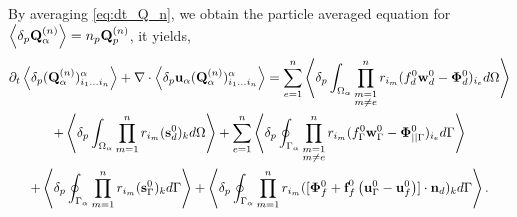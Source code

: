 By averaging \ref{eq:dt_Q_n}, we obtain the particle averaged equation for $\left<\delta_{p} \textbf{Q}_\alpha^{(n)}\right> = n_p\textbf{Q}_p^{(n)} $, it yields,
\begin{multline}
    \pddt \pavg{(\textbf{Q}_\alpha^{(n)})_{i_1\ldots i_n}^\alpha}
    + \div  \pavg{\textbf{u}_\alpha (\textbf{Q}_\alpha^{(n)})_{i_1\ldots i_n}^\alpha}
    = \sum_{e=1}^{n} 
    \pOavg{
        \prod^{n}_{\substack{ m=1 \\m \neq e}} r_{i_m} (f_d^0\textbf{w}_d^0  - \bm\Phi_d^0)_{i_e}
    }\\
    + \pOavg{ \pri{1}{n} (\textbf{s}_d^0)_k }
    +     
    \sum_{e=1}^{n} 
    \pSavg{
        \prod^{n}_{\substack{ m=1 \\m \neq e}} r_{i_m} (f_\Gamma^0\textbf{w}_\Gamma^0 - \bm\Phi_{||\Gamma}^0)_{i_e}
    }\\
    + \pSavg{ \pri{1}{n} (\textbf{s}_\Gamma^0)_k }
    +\pSavg{ \pri{1}{n} ([\bm\Phi_f^0 + \textbf{f}_f^0 \left(\textbf{u}_\Gamma^0 - \textbf{u}_f^0\right)]\cdot \textbf{n}_d)_k }. 
    \label{eq:avg_hybrid_q_n}
\end{multline}

